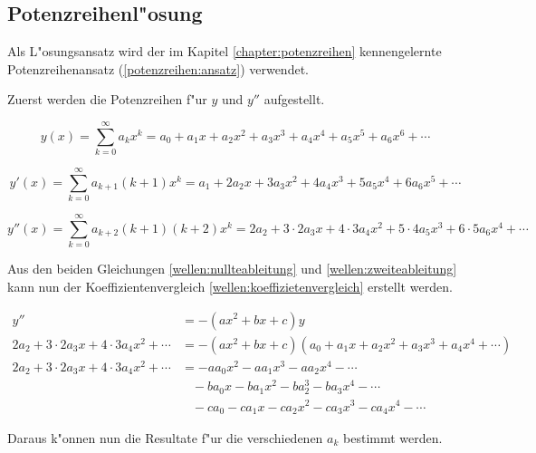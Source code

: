 \begin{refsection}
\section{Potenzreihenl"osung}
Als L"osungsansatz wird der im Kapitel \ref{chapter:potenzreihen} 
kennengelernte Potenzreihenansatz (\ref{potenzreihen:ansatz}) verwendet.

Zuerst werden die Potenzreihen f"ur $y$ und $y''$ aufgestellt.

\begin{equation}
	y(x)
	=
	\sum_{k = 0}^{\infty} a_{k}x^k
	=
	a_0 + a_1x + a_2x^2 + a_3x^3 + a_4x^4 + a_5x^5 + a_6x^6 + \dotsb
	\label{wellen:nullteableitung}
\end{equation}

\begin{equation*}
	y'(x)
	=
	\sum_{k=0}^{\infty} a_{k+1}(k+1)x^k
	=
	a_1 + 2a_2x + 3a_3x^2 + 4a_4x^3 + 5a_5x^4 + 6a_6x^5+ \dotsb
\end{equation*}

\begin{equation}
	y''(x)
	=
	\sum_{k = 0}^{\infty} a_{k+2}(k+1)(k+2)x^k
	=
	2a_2 + 3 \mathbin{\cdot} 2a_3x + 4 \mathbin{\cdot} 3a_4x^2 + 5 
	\mathbin{\cdot} 4a_5x^3 + 6 \mathbin{\cdot} 5a_6x^4 + \dotsb
	\label{wellen:zweiteableitung}
\end{equation}

Aus den beiden Gleichungen \ref{wellen:nullteableitung} und 
\ref{wellen:zweiteableitung} kann nun der Koeffizientenvergleich 
\ref{wellen:koeffizietenvergleich} erstellt werden.

\begin{equation}
	\begin{split}
		y''
		&=
		-(ax^2+bx+c)y \\
		2a_2 + 3 \mathbin{\cdot} 2a_3x + 4 \mathbin{\cdot} 3a_4x^2 + \dotsb
		&=
		-(ax^2+bx+c)(a_0 + a_1x + a_2x^2 + a_3x^3 + a_4x^4 + \dotsb) \\
		2a_2 + 3 \mathbin{\cdot} 2a_3x + 4 \mathbin{\cdot} 3a_4x^2 + \dotsb
		&=
		-aa_0x^2-aa_1x^3-aa_2x^4-\dotsb \\
		&\hspace{10pt}
		-ba_0x-ba_1x^2-ba_2^3-ba_3x^4-\dotsb \\
		&\hspace{10pt}
		-ca_0-ca_1x-ca_2x^2-ca_3x^3-ca_4x^4 - \dotsb
	\end{split}
	\label{wellen:koeffizietenvergleich}
\end{equation}

Daraus k"onnen nun die Resultate f"ur die verschiedenen $a_k$ bestimmt werden.


\end{refsection}
